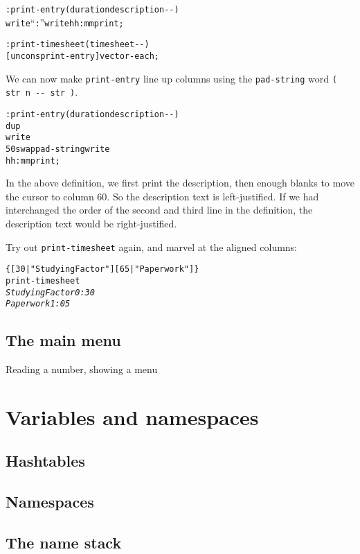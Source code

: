 \documentclass[english]{article}
\begin{document}
\begin{alltt}
: print-entry ( duration description -{}- )
    write {}``: '' write hh:mm print ;

: print-timesheet ( timesheet -{}- )
    {[} uncons print-entry {]} vector-each ;
\end{alltt}
We can now make \texttt{print-entry} line up columns using the \texttt{pad-string}
word \texttt{( str n -{}- str )}.

\begin{alltt}
: print-entry ( duration description -{}- )
    dup
    write
    50 swap pad-string write 
    hh:mm print ;
\end{alltt}
In the above definition, we first print the description, then enough
blanks to move the cursor to column 60. So the description text is
left-justified. If we had interchanged the order of the second and
third line in the definition, the description text would be right-justified.

Try out \texttt{print-timesheet} again, and marvel at the aligned
columns:

\begin{alltt}
\{ {[} 30 | "Studying Factor" {]} {[} 65 | "Paperwork" {]} \}
print-timesheet
\emph{Studying Factor                                   0:30}
\emph{Paperwork                                         1:05}
\end{alltt}

\subsection{The main menu}

Reading a number, showing a menu


\section{Variables and namespaces}


\subsection{Hashtables}


\subsection{Namespaces}


\subsection{The name stack}
\end{document}
